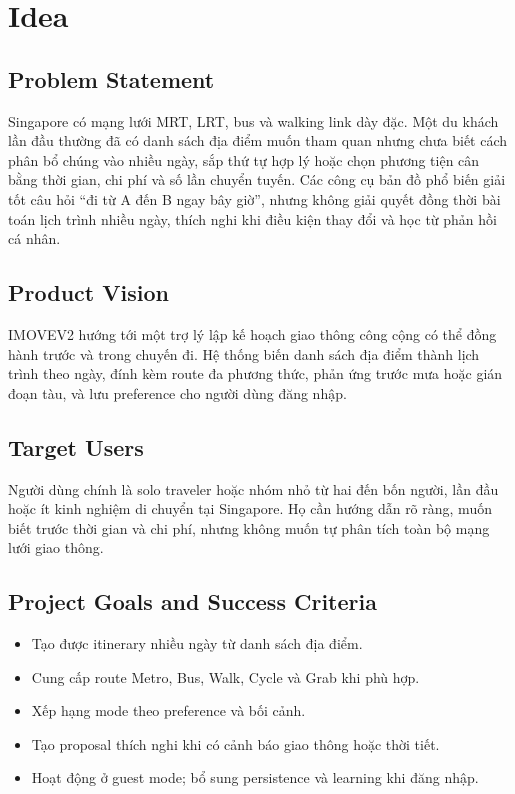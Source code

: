 \chapter{Idea}

\section{Problem Statement}

Singapore có mạng lưới MRT, LRT, bus và walking link dày đặc. Một du khách lần đầu thường đã có danh sách địa điểm muốn tham quan nhưng chưa biết cách phân bổ chúng vào nhiều ngày, sắp thứ tự hợp lý hoặc chọn phương tiện cân bằng thời gian, chi phí và số lần chuyển tuyến. Các công cụ bản đồ phổ biến giải tốt câu hỏi ``đi từ A đến B ngay bây giờ'', nhưng không giải quyết đồng thời bài toán lịch trình nhiều ngày, thích nghi khi điều kiện thay đổi và học từ phản hồi cá nhân.

\section{Product Vision}

IMOVEV2 hướng tới một trợ lý lập kế hoạch giao thông công cộng có thể đồng hành trước và trong chuyến đi. Hệ thống biến danh sách địa điểm thành lịch trình theo ngày, đính kèm route đa phương thức, phản ứng trước mưa hoặc gián đoạn tàu, và lưu preference cho người dùng đăng nhập.

\section{Target Users}

Người dùng chính là solo traveler hoặc nhóm nhỏ từ hai đến bốn người, lần đầu hoặc ít kinh nghiệm di chuyển tại Singapore. Họ cần hướng dẫn rõ ràng, muốn biết trước thời gian và chi phí, nhưng không muốn tự phân tích toàn bộ mạng lưới giao thông.

\section{Project Goals and Success Criteria}

\begin{itemize}
  \item Tạo được itinerary nhiều ngày từ danh sách địa điểm.
  \item Cung cấp route Metro, Bus, Walk, Cycle và Grab khi phù hợp.
  \item Xếp hạng mode theo preference và bối cảnh.
  \item Tạo proposal thích nghi khi có cảnh báo giao thông hoặc thời tiết.
  \item Hoạt động ở guest mode; bổ sung persistence và learning khi đăng nhập.
\end{itemize}

